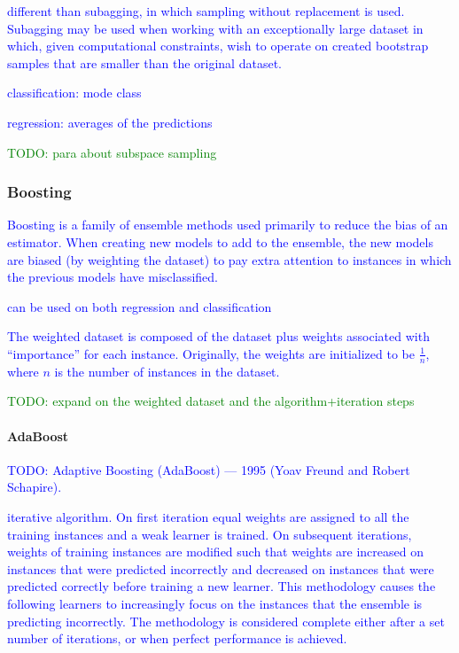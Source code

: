 \textcolor{blue}{different than subagging, in which {sampling without replacement} is used. Subagging may be used when working with an exceptionally large dataset in which, given computational constraints, wish to operate on created bootstrap samples that are smaller than the original dataset.}

\textcolor{blue}{classification: mode class}

\textcolor{blue}{regression: averages of the predictions}

\textcolor{green}{TODO: para about {subspace sampling}}

\subsubsection{Boosting}

\textcolor{blue}{Boosting is a family of ensemble methods used primarily to reduce the bias of an estimator. When creating new models to add to the ensemble, the new models are biased (by weighting the dataset) to pay extra attention to instances in which the previous models have misclassified.}

\textcolor{blue}{can be used on both regression and classification}

\textcolor{blue}{The weighted dataset is composed of the dataset plus weights associated with ``importance'' for each instance. Originally, the weights are initialized to be $\frac{1}{n}$, where $n$ is the number of instances in the dataset.}

\textcolor{green}{TODO: expand on the weighted dataset and the algorithm+iteration steps}

\paragraph{AdaBoost}

\textcolor{blue}{TODO: Adaptive Boosting (AdaBoost) --- 1995 (Yoav Freund and Robert Schapire).}

\textcolor{blue}{iterative algorithm. On first iteration equal weights are assigned to all the training instances and a weak learner is trained. On subsequent iterations, weights of training instances are modified such that weights are increased on instances that were predicted incorrectly and decreased on instances that were predicted correctly before training a new learner. This methodology causes the following learners to increasingly focus on the instances that the ensemble is predicting incorrectly. The methodology is considered complete either after a set number of iterations, or when perfect performance is achieved.}

